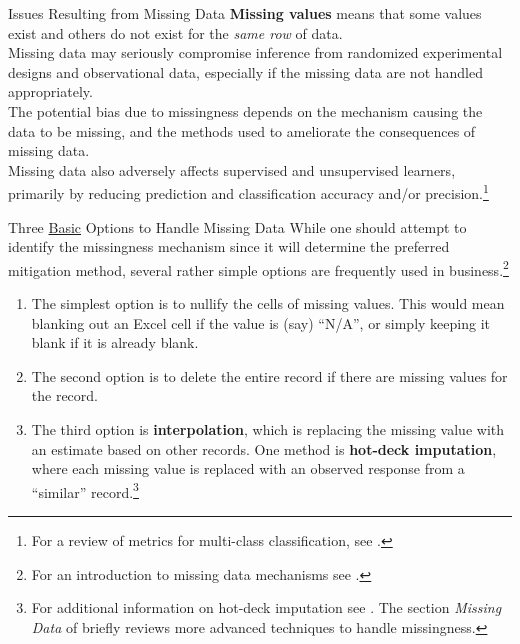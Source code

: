 \documentclass[pdf]{beamer}
\newcommand{\empr}[1]{{\color{franklinblue}\textbf{#1}}}
\theoremstyle{remark}
\theoremstyle{definition}
\begin{document}
\begin{frame}[t]{Issues Resulting from Missing Data}
\empr{Missing values} means that some values exist and others do not exist for the \textit{same row} of data. \\
\vspace{1.5ex}
Missing data may seriously compromise inference from randomized experimental designs and observational data, especially if the missing data are not handled appropriately. \\
\vspace{1.5ex} 
The potential bias due to missingness depends on the mechanism causing the data to be missing, and the methods used to ameliorate the consequences of missing data. \\ 
\vspace{1.5ex}
Missing data also adversely affects supervised and unsupervised learners, primarily by reducing prediction and classification accuracy and/or precision.\footnote{For a review of metrics for multi-class classification, see \cite{grandini2020}.} 
\end{frame}

\begin{frame}[t]{Three \underline{Basic} Options to Handle Missing Data}
While one should attempt to identify the missingness mechanism since it will determine the preferred mitigation method, several rather simple options are frequently used in business.\footnote{For an introduction to missing data mechanisms see \cite{jakobsen2017}.}  \\
\vspace{0.5ex}
\small
\begin{enumerate}
  \item The simplest option is to nullify the cells of missing values. This would mean blanking out an Excel cell if the value is (say) ``N/A'', or simply keeping it blank if it is already blank.
  \item The second option is to delete the entire record if there are missing values for the record.
  \item The third option is \empr{interpolation}, which is replacing the missing value with an estimate based on other records. %
  One method is \empr{hot-deck imputation}, where each missing value is replaced with an observed response from a ``similar'' record.\footnote{For additional information on hot-deck imputation see \cite{andridge2010}.  The section \textit{Missing Data} of \cite{burke2021c} briefly reviews more advanced techniques to handle missingness.}
\end{enumerate}
\end{frame}
\end{document}
